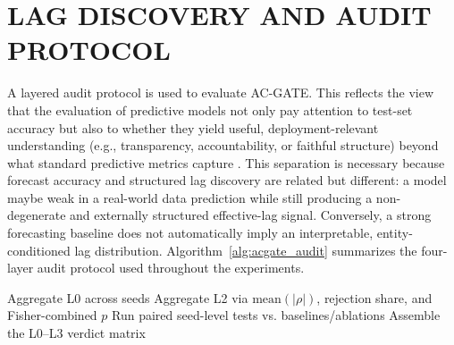 \documentclass[conference]{IEEEtran}
\begin{document}
\section{LAG DISCOVERY AND AUDIT PROTOCOL}\label{sec:audit_protocol}
A layered audit protocol is used to evaluate AC-GATE. This reflects the view that the evaluation of predictive models not only pay attention to test-set accuracy but also to whether they yield useful, deployment-relevant understanding (e.g., transparency, accountability, or faithful structure) beyond what standard predictive metrics capture \cite{lipton2018mythos,rudin2019stop}. This separation is necessary because forecast accuracy and structured lag discovery are related but different: a model maybe weak in a real-world data prediction while still producing a non-degenerate and externally structured effective-lag signal. Conversely, a strong forecasting baseline does not automatically imply an interpretable, entity-conditioned lag distribution. Algorithm~\ref{alg:acgate_audit} summarizes the four-layer audit protocol used throughout the experiments.

\begin{algorithm}[!tbhp]
\caption{Lag Discovery and Layered Audit}
\label{alg:acgate_audit}


Aggregate L0 across seeds\;
Aggregate L2 via $\mathrm{mean}(|\rho|)$, rejection share, and Fisher-combined $p$\;
Run paired seed-level tests vs. baselines/ablations\;
Assemble the L0--L3 verdict matrix\;
\end{algorithm}
\end{document}
